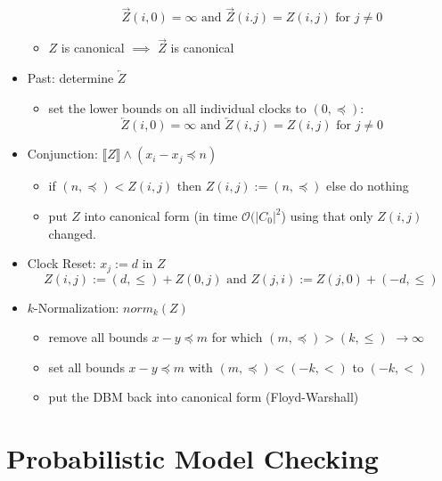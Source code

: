 \documentclass[a4paper, 10pt]{article}
\renewcommand{\O}{\mathcal{O}}
\begin{document}
\begin{mdframed}
\begin{itemize}
\begin{itemize}
        \[ \overrightarrow{Z}(i,0)=\infty \text{ and } \overrightarrow{Z}(i.j)=Z(i,j) \text{ for } j\not=0 \]
        \item $Z$ is canonical $\implies$ $\overrightarrow{Z}$ is canonical
    \end{itemize}
    \item Past: determine $\overleftarrow{Z}$
    \begin{itemize}
        \item set the lower bounds on all individual clocks to $(0,\preceq)$:
        \[ \overleftarrow{Z}(i,0)=\infty \text{ and } \overleftarrow{Z}(i,j)=Z(i,j) \text{ for } j\not=0 \] 
    \end{itemize}
    \item Conjunction: $\llbracket Z\rrbracket \wedge (x_i-x_j\preceq n)$
    \begin{itemize}
        \item if $(n,\preceq)<Z(i,j)$ then $Z(i,j):=(n,\preceq)$ else do nothing
        \item put $Z$ into canonical form (in time $\O(|C_0|^2$) using that only $Z(i,j)$ changed.
    \end{itemize}
    \item Clock Reset: $x_j:=d$ in $Z$
    \[ Z(i,j):=(d,\leq)+Z(0,j) \text{ and } Z(j,i):= Z(j,0)+(-d,\leq) \]
    \item $k$-Normalization: $norm_k(Z)$
    \begin{itemize}
        \item remove all bounds $x-y\preceq m$ for which $(m,\preceq)>(k,\leq)$ {\tiny $\to \infty$}
        \item set all bounds $x-y\preceq m$ with $(m,\preceq)<(-k,<)$ to $(-k,<)$
        \item put the DBM back into canonical form (Floyd-Warshall)
    \end{itemize}
\end{itemize}
\end{mdframed}

\section{Probabilistic Model Checking}
\end{document}
